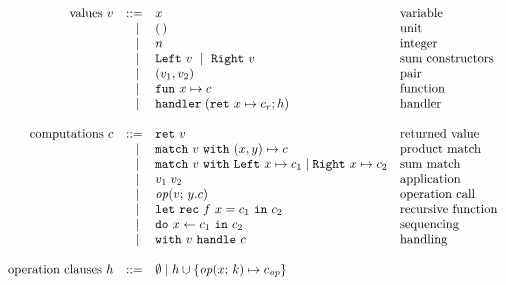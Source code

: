 
\[
	\begin{array}{rrll}
		\text{values}~v
		 & ::=   & x                      			& \text{variable}          \\
		 & \vsep & \unit												& \text{unit}							 \\
		 & \vsep & n														& \text{integer}					 \\
		 & \vsep & \inleft{v}~\vsep~\inright{v} & \text{sum constructors}  \\
		 & \vsep & \pair{v_1}{v_2}							&	\text{pair}						 	 \\
		 & \vsep & \fun{x}{c}             			& \text{function}          \\
		 & \vsep & \handler{h}      						& \text{handler}           \\
		 \\
		 \text{computations}~c
		 & ::=   & \return{v}             		& \text{returned value}    				\\
		 & \vsep & \match{v} \pair{x}{y} \mapsto c 	 		& \text{product match} 	\\
		 & \vsep & \match{v} \sumcases{x}{c_1}{x}{c_2} 	& \text{sum match} 			\\
		 & \vsep & \apply{v_1}{v_2}       		& \text{application}       				\\
		 & \vsep & \operation{v}{y.c}     		& \text{operation call}    				\\
		 & \vsep & \letrec{f}{x}{c_1} {c_2}		& \text{recursive function} 			\\
		 & \vsep & \dobind{x}{c_1}{c_2}   		& \text{sequencing}        				\\
		 & \vsep & \withhandle{v}{c}      		& \text{handling}					 				\\
		 \\
		 \text{operation clauses}~h
			& ::=   & \emptyhcases 
			\vsep 		h \union \set{\operation{x}{k} \mapsto c_{\op}} 	\\
		\end{array}
		\]
